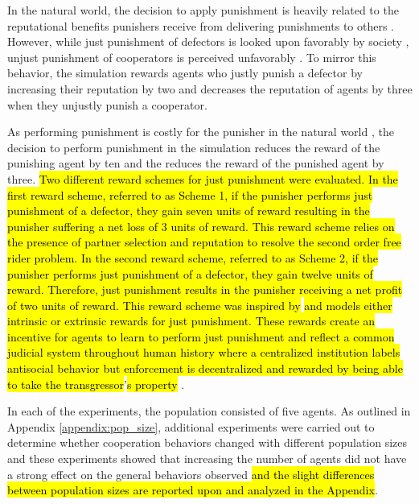 \documentclass[sn-aps,numbered]{sn-jnl}%
\theoremstyle{thmstyleone}%
\theoremstyle{thmstyletwo}%
\theoremstyle{thmstylethree}%
\begin{document}
In the natural world, the decision to apply punishment is heavily related to the reputational benefits punishers receive from delivering punishments to others \citep{Redhead2021, boyd1992punishment}. However, while just punishment of defectors is looked upon favorably by society \citep{Redhead2021, boyd1992punishment, Raihani2015_tpp_rewarded_helpers}, unjust punishment of cooperators is perceived unfavorably \citep{Rand2010, Pleasant2018}. To mirror this behavior, the simulation rewards agents who justly punish a defector by increasing their reputation by two and decreases the reputation of agents by three when they unjustly punish a cooperator. 

As performing punishment is costly for the punisher in the natural world \citep{Redhead2021, Barclay2016}, the decision to perform punishment in the simulation reduces the reward of the punishing agent by ten and the reduces the reward of the punished agent by three. \hl{Two different reward schemes for just punishment were evaluated. In the first reward scheme, referred to as Scheme 1, if the punisher performs just punishment of a defector, they gain seven units of reward resulting in the punisher suffering a net loss of 3 units of reward. This reward scheme relies on the presence of partner selection and reputation to resolve the second order free rider problem.  In the second reward scheme, referred to as Scheme 2, if the punisher performs just punishment of a defector, they gain twelve units of reward. Therefore, just punishment results in the punisher receiving a net profit of two units of reward. This reward scheme was inspired by} \citep{silly_rules_ssd} \hl{and models either intrinsic or extrinsic rewards for just punishment. These rewards create an incentive for agents to learn to perform just punishment and reflect a common judicial system throughout human history where a centralized institution labels antisocial behavior but enforcement is decentralized and rewarded by being able to take the transgressor}’\hl{s property} \citep{silly_rules_ssd}.

In each of the experiments, the population consisted of five agents. As outlined in Appendix \ref{appendix:pop_size}, additional experiments were carried out to determine whether cooperation behaviors changed with different population sizes and these experiments showed that increasing the number of agents did not have a strong effect on the general behaviors observed \hl{and the slight differences between population sizes are reported upon and analyzed in the Appendix}.
\end{document}
